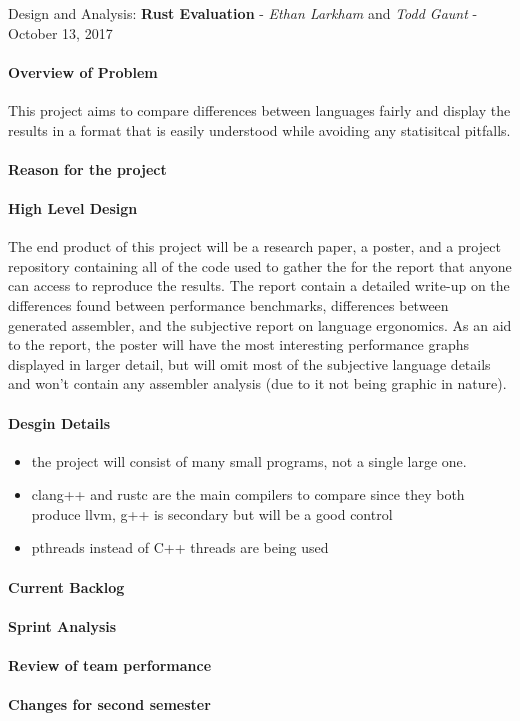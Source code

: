 \documentclass[10pt,a4paper]{report}
\begin{document}
\begin{center}
	{\Large Design and Analysis: {\bfseries Rust Evaluation}}
	- {\large{\itshape Ethan Larkham} and {\itshape Todd Gaunt}}
	- {\large October 13, 2017}
\end{center}
\vspace{0.5em}
\paragraph{Overview of Problem}
This project aims to compare differences between languages fairly
and display the results in a format that is easily understood while avoiding
any statisitcal pitfalls.
\paragraph{Reason for the project}
\paragraph{High Level Design}
The end product of this project will be a research paper, a poster, and a
project repository containing all of the code used to gather the for the report
that anyone can access to reproduce the results. The report contain a detailed
write-up on the differences found between performance benchmarks, differences
between generated assembler, and the subjective report on language ergonomics.
As an aid to the report, the poster will have the most interesting performance
graphs displayed in larger detail, but will omit most of the subjective
language details and won't contain any assembler analysis (due to it not being
graphic in nature).
\paragraph{Desgin Details}
\begin{flushleft}
	\begin{itemize}
		\item the project will consist of many small programs, not a
			single large one.
		\item clang++ and rustc are the main compilers to compare since
			they both produce llvm, g++ is secondary but will be a
			good control
		\item pthreads instead of C++ threads are being used
	\end{itemize}
\end{flushleft}
\paragraph{Current Backlog}
\paragraph{Sprint Analysis}
\paragraph{Review of team performance}
\paragraph{Changes for second semester}
\end{document}
